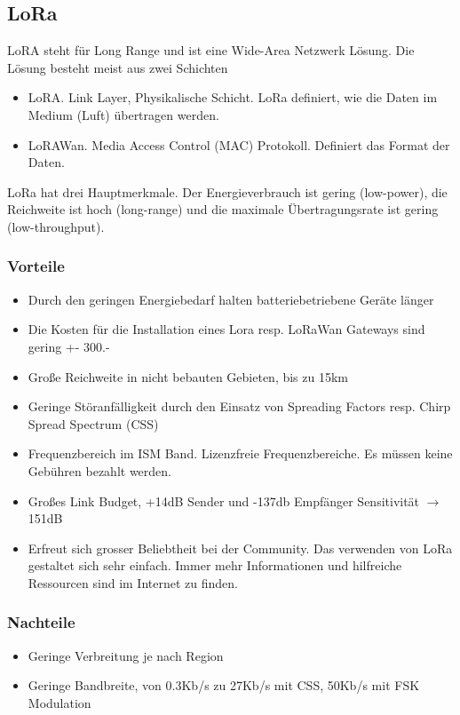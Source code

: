 \documentclass[11pt,english,german]{report}
\theoremstyle{definition}
\begin{document}
\subsection{LoRa}
LoRA steht für Long Range und ist eine Wide-Area Netzwerk Lösung. Die Lösung besteht meist aus zwei Schichten
\begin{itemize}
	\item LoRA. Link Layer, Physikalische Schicht. LoRa definiert, wie die Daten im Medium (Luft) übertragen werden.
	\item LoRAWan. Media Access Control (MAC) Protokoll. Definiert das Format der Daten.
\end{itemize}
LoRa hat drei Hauptmerkmale. Der Energieverbrauch ist gering (low-power), die Reichweite ist hoch (long-range) und die maximale Übertragungsrate ist gering (low-throughput).
\subsubsection{Vorteile}
\begin{itemize}
	\item Durch den geringen Energiebedarf halten batteriebetriebene Geräte länger
	\item Die Kosten für die Installation eines Lora resp. LoRaWan Gateways sind gering +- 300.-
	\item Große Reichweite in nicht bebauten Gebieten, bis zu 15km
	\item Geringe Störanfälligkeit durch den Einsatz von Spreading Factors resp. Chirp Spread Spectrum (CSS)
	\item Frequenzbereich im ISM Band. Lizenzfreie Frequenzbereiche. Es müssen keine Gebühren bezahlt werden.
	\item Großes Link Budget, +14dB Sender und -137db Empfänger Sensitivität $\rightarrow$ 151dB
	\item Erfreut sich grosser Beliebtheit bei der Community. Das verwenden von LoRa gestaltet sich sehr einfach. Immer mehr Informationen und hilfreiche Ressourcen sind im Internet zu finden.
\end{itemize}
\subsubsection{Nachteile}
\begin{itemize}
	\item Geringe Verbreitung je nach Region
	\item Geringe Bandbreite, von 0.3Kb/s zu 27Kb/s mit CSS, 50Kb/s mit FSK Modulation \cite{loradatarate}
\end{itemize}
\end{document}

